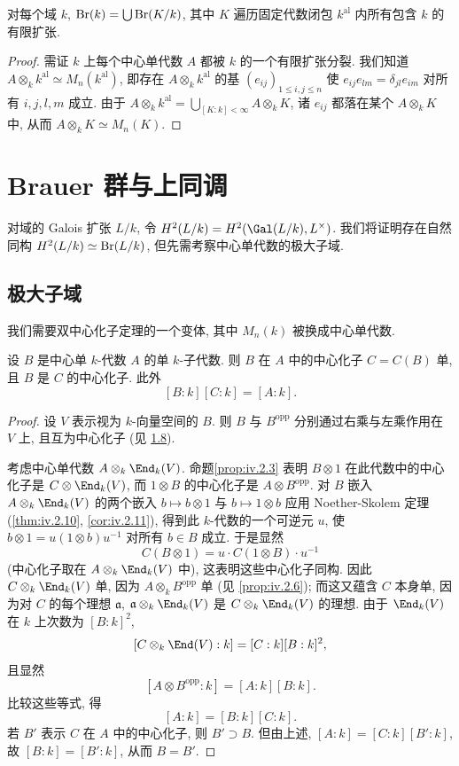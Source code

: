 \begin{proposition}\label{prop:iv.2.17}
对每个域 $k$, $\operatorname{Br}(k)=\bigcup\operatorname{Br}(K/k)$, 其中 $K$ 遍历固定代数闭包 $k^{\mathrm{al}}$ 内所有包含 $k$ 的有限扩张.
\end{proposition}

\begin{proof}
需证 $k$ 上每个中心单代数 $A$ 都被 $k$ 的一个有限扩张分裂. 我们知道 $A\otimes_k k^{\mathrm{al}}\simeq M_n(k^{\mathrm{al}})$, 即存在 $A\otimes_k k^{\mathrm{al}}$ 的基 $(e_{ij})_{1\le i,j\le n}$ 使 $e_{ij}e_{lm}=\delta_{jl}e_{im}$ 对所有 $i,j,l,m$ 成立. 由于 $A\otimes_k k^{\mathrm{al}}=\bigcup_{[K:k]<\infty}A\otimes_k K$, 诸 $e_{ij}$ 都落在某个 $A\otimes_k K$ 中, 从而 $A\otimes_k K\simeq M_n(K)$.
\end{proof}

\section{Brauer 群与上同调}\label{sec:IV.3}

对域的 Galois 扩张 $L/k$, 令 $H^2(L/k)=H^2(\Gal(L/k),L^{\times})$. 我们将证明存在自然同构 $H^2(L/k)\simeq\operatorname{Br}(L/k)$, 但先需考察中心单代数的极大子域.

\subsection*{极大子域}

我们需要双中心化子定理的一个变体, 其中 $M_n(k)$ 被换成中心单代数.

\begin{theorem}\label{thm:iv.3.1}
设 $B$ 是中心单 $k$-代数 $A$ 的单 $k$-子代数. 则 $B$ 在 $A$ 中的中心化子 $C=C(B)$ 单, 且 $B$ 是 $C$ 的中心化子. 此外
\[
[B:k][C:k]=[A:k].
\]
\end{theorem}

\begin{proof}
设 $V$ 表示视为 $k$-向量空间的 $B$. 则 $B$ 与 $B^{\mathrm{opp}}$ 分别通过右乘与左乘作用在 $V$ 上, 且互为中心化子 (见 \hyperlink{item:iv.1.8}{1.8}).

考虑中心单代数 $A\otimes_k\End_k(V)$. 命题\ref{prop:iv.2.3} 表明 $B\otimes 1$ 在此代数中的中心化子是 $C\otimes\End_k(V)$, 而 $1\otimes B$ 的中心化子是 $A\otimes B^{\mathrm{opp}}$. 对 $B$ 嵌入 $A\otimes_k\End_k(V)$ 的两个嵌入 $b\mapsto b\otimes 1$ 与 $b\mapsto 1\otimes b$ 应用 Noether-Skolem 定理 (\ref{thm:iv.2.10}, \ref{cor:iv.2.11}), 得到此 $k$-代数的一个可逆元 $u$, 使 $b\otimes 1=u(1\otimes b)u^{-1}$ 对所有 $b\in B$ 成立. 于是显然
\[
C(B\otimes1)=u\cdot C(1\otimes B)\cdot u^{-1}
\]
(中心化子取在 $A\otimes_k\End_k(V)$ 中), 这表明这些中心化子同构. 因此 $C\otimes_k\End_k(V)$ 单, 因为 $A\otimes_k B^{\mathrm{opp}}$ 单 (见 \ref{prop:iv.2.6}); 而这又蕴含 $C$ 本身单, 因为对 $C$ 的每个理想 $\mathfrak{a}$, $\mathfrak{a}\otimes_k\End_k(V)$ 是 $C\otimes_k\End_k(V)$ 的理想. 由于 $\End_k(V)$ 在 $k$ 上次数为 $[B:k]^2$,
\[
[C\otimes_{k}\End(V):k]=[C:k][B:k]^{2},
\]
且显然
\[
[A\otimes B^{\mathrm{opp}}:k]=[A:k][B:k].
\]
比较这些等式, 得
\[
[A:k]=[B:k][C:k].
\]
若 $B'$ 表示 $C$ 在 $A$ 中的中心化子, 则 $B'\supset B$. 但由上述, $[A:k]=[C:k][B':k]$, 故 $[B:k]=[B':k]$, 从而 $B=B'$.
\end{proof}


